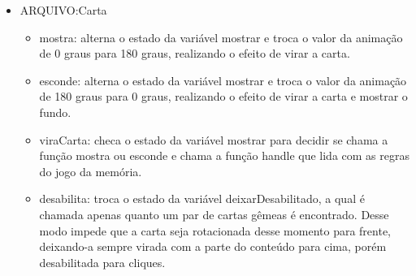 \begin{itemize}
\item ARQUIVO:Carta
	\begin{itemize}
	\item mostra: alterna o estado da variável mostrar e troca o valor da animação de 0 graus para 180 graus, realizando o efeito de virar a carta.

	\item esconde: alterna o estado da variável mostrar e troca o valor da animação de 180 graus para 0 graus, realizando o efeito de virar a carta e mostrar o fundo.

	\item viraCarta: checa o estado da variável mostrar para decidir se chama a função mostra ou esconde e chama a função handle que lida com as regras do jogo da memória.

	\item desabilita: troca o estado da variável deixarDesabilitado, a qual é chamada apenas quanto um par de cartas gêmeas é encontrado. Desse modo impede que a carta seja rotacionada desse momento para frente, deixando-a sempre virada com a parte do conteúdo para cima, porém desabilitada para cliques.

	\end{itemize}
\end{itemize}
